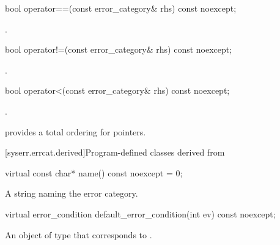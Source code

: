 %
\begin{itemdecl}
bool operator==(const error_category& rhs) const noexcept;
\end{itemdecl}

\begin{itemdescr}
\pnum
\returns {}.
\end{itemdescr}

%
\begin{itemdecl}
bool operator!=(const error_category& rhs) const noexcept;
\end{itemdecl}

\begin{itemdescr}
\pnum
\returns {}.
\end{itemdescr}

%
\begin{itemdecl}
bool operator<(const error_category& rhs) const noexcept;
\end{itemdecl}

\begin{itemdescr}
\pnum
\returns {}.

\begin{note}  provides a total ordering for pointers. \end{note}
\end{itemdescr}

[syserr.errcat.derived]{Program-defined classes derived from }

%
\begin{itemdecl}
virtual const char* name() const noexcept = 0;
\end{itemdecl}

\begin{itemdescr}
\pnum
\returns A string naming the error category.
\end{itemdescr}

%
\begin{itemdecl}
virtual error_condition default_error_condition(int ev) const noexcept;
\end{itemdecl}

\begin{itemdescr}
\pnum
\returns An object of type  that corresponds to .
\end{itemdescr}

